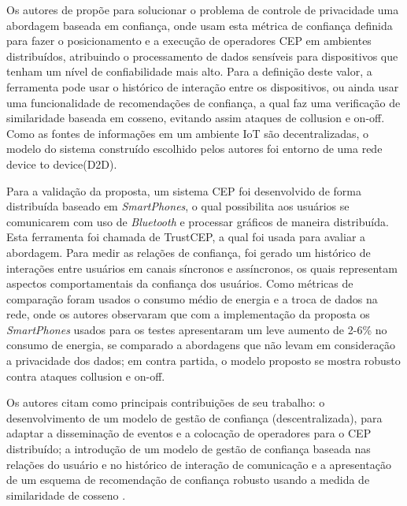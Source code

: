\documentclass[ti,table]{texufpel} %
\begin{document}
     

     

    Os autores de \cite{art6dwarakanath2017trustcep} propõe para solucionar o problema de controle de privacidade uma abordagem baseada em confiança, onde usam esta métrica de confiança definida para fazer o posicionamento e a execução de operadores CEP em ambientes distribuídos, atribuindo o processamento de dados sensíveis para dispositivos que tenham um nível de confiabilidade mais alto. Para a definição deste valor, a ferramenta pode usar o histórico de interação entre os dispositivos, ou ainda usar uma funcionalidade de recomendações de confiança, a qual faz uma verificação de similaridade baseada em cosseno, evitando assim ataques de collusion e on-off. Como as fontes de informações em um ambiente IoT são decentralizadas, o modelo do sistema construído escolhido pelos autores foi entorno de uma rede device to device(D2D). 

     

     

    Para a validação da proposta, um sistema CEP foi desenvolvido de forma distribuída baseado em \textit{SmartPhones}, o qual possibilita aos usuários se comunicarem com uso de \textit{Bluetooth} e processar gráficos de maneira distribuída. Esta ferramenta foi chamada de TrustCEP, a qual foi usada para avaliar a abordagem. Para medir as relações de confiança, foi gerado um histórico de interações entre usuários em canais síncronos e assíncronos, os quais representam aspectos comportamentais da confiança dos usuários. Como métricas de comparação foram usados o consumo médio de energia e a troca de dados na rede, onde os autores observaram que com a implementação da proposta os \textit{SmartPhones} usados para os testes apresentaram um leve aumento de 2-6\% no consumo de energia, se comparado a abordagens que não levam em consideração a privacidade dos dados; em contra partida, o modelo proposto se mostra robusto contra ataques collusion e on-off. 

    Os autores citam como principais contribuições de seu trabalho: o desenvolvimento de um modelo de gestão de confiança (descentralizada), para adaptar a disseminação de eventos e a colocação de operadores para o CEP distribuído; a introdução de um modelo de gestão de confiança baseada nas relações do usuário e no histórico de interação de comunicação e a apresentação de um esquema de recomendação de confiança robusto usando a medida de similaridade de cosseno \cite{art6dwarakanath2017trustcep}. 
\end{document}
